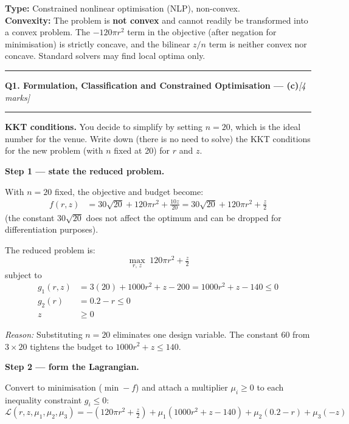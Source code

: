 \documentclass[10pt,a4paper]{article}
\newcommand{\sectitle}[2]{%
  \vspace{10pt}\noindent\rule{\linewidth}{0.8pt}\par\vspace{2pt}%
  {\large\textbf{#1}\hfill\normalsize\textit{[#2 marks]}}\par
  \vspace{2pt}\rule{\linewidth}{0.4pt}\vspace{4pt}}
\newcommand{\reason}[1]{%
  \begin{mdframed}[backgroundcolor=reasonbg, linewidth=0.4pt,
    innertopmargin=3pt, innerbottommargin=3pt,
    innerleftmargin=6pt, innerrightmargin=6pt]
    \small\textit{Reason:} \small #1
  \end{mdframed}\vspace{2pt}}
\newenvironment{resultbox}{%
  \begin{mdframed}[backgroundcolor=boxbg, linewidth=0.6pt,
    innertopmargin=5pt, innerbottommargin=5pt,
    innerleftmargin=8pt, innerrightmargin=8pt]
}{\end{mdframed}}
\begin{document}
\begin{resultbox}
\textbf{Type:} Constrained nonlinear optimisation (NLP), non-convex.\\[4pt]
\textbf{Convexity:} The problem is \textbf{not convex} and cannot readily
be transformed into a convex problem. The $-120\pi r^2$ term in the
objective (after negation for minimisation) is strictly concave, and the
bilinear $z/n$ term is neither convex nor concave. Standard solvers may
find local optima only.
\end{resultbox}

\newpage
\sectitle{Q1. Formulation, Classification and Constrained Optimisation --- (c)}{4}

\noindent\textbf{KKT conditions.} You decide to simplify by setting $n=20$,
which is the ideal number for the venue. Write down (there is no need to
solve) the KKT conditions for the new problem (with $n$ fixed at 20)
for $r$ and $z$.

\vspace{6pt}
\textbf{Step 1 --- state the reduced problem.}

With $n=20$ fixed, the objective and budget become:
\begin{align*}
  f(r,z)  &= 30\sqrt{20} + 120\pi r^2 + \tfrac{10z}{20}
            = 30\sqrt{20} + 120\pi r^2 + \tfrac{z}{2}
\end{align*}
(the constant $30\sqrt{20}$ does not affect the optimum and can be
dropped for differentiation purposes).

The reduced problem is:
\[
  \max_{r,\,z}\; 120\pi r^2 + \tfrac{z}{2}
\]
subject to
\begin{align*}
  g_1(r,z) &= 3(20) + 1000r^2 + z - 200 = 1000r^2 + z - 140 \le 0 \\
  g_2(r)   &= 0.2 - r \le 0 \\
  z        &\ge 0
\end{align*}

\reason{Substituting $n=20$ eliminates one design variable. The constant
        $60$ from $3\times 20$ tightens the budget to $1000r^2 + z \le 140$.}

\textbf{Step 2 --- form the Lagrangian.}

Convert to minimisation ($\min -f$) and attach a multiplier $\mu_i \ge 0$
to each inequality constraint $g_i \le 0$:
\[
  \mathcal{L}(r,z,\mu_1,\mu_2,\mu_3)
  = -(120\pi r^2 + \tfrac{z}{2})
  + \mu_1(1000r^2 + z - 140)
  + \mu_2(0.2 - r)
  + \mu_3(-z)
\]
\end{document}
